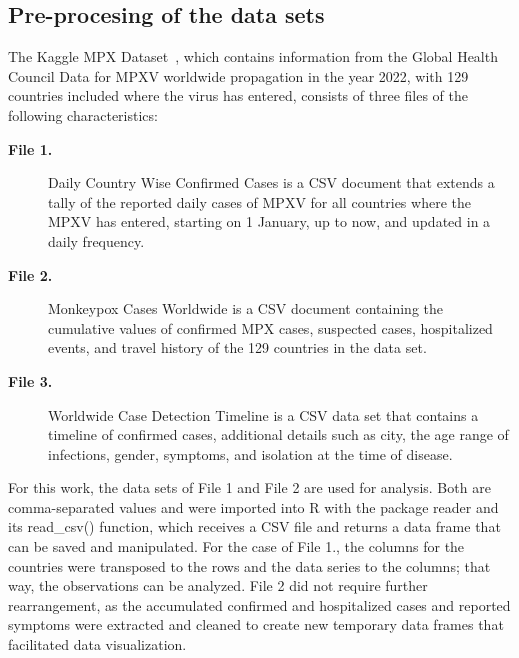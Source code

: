 \documentclass[conference]{IEEEtran}
\begin{document}
\subsection{Pre-procesing of the data sets}
The Kaggle MPX Dataset~\cite{Contractor2022}, which contains information from the Global Health Council Data for MPXV worldwide propagation in the year 2022, with 129 countries included where the virus has entered, consists of three files of the following characteristics:  

\begin{description}
    \item [\textbf{File 1.}] Daily Country Wise Confirmed Cases is a CSV document that extends a tally of the reported daily cases of MPXV for all countries where the MPXV has entered, starting on 1 January, up to now, and updated in a daily frequency. 
    \item [\textbf{File 2.}] Monkeypox Cases Worldwide is a CSV document containing the cumulative values of confirmed MPX cases, suspected cases, hospitalized events, and travel history of the 129 countries in the data set.
    \item [\textbf{File 3.}] Worldwide Case Detection Timeline is a CSV data set that contains a timeline of confirmed cases, additional details such as city, the age range of infections, gender, symptoms, and isolation at the time of disease.
\end{description}

For this work, the data sets of File 1 and File 2 are used for analysis. Both are comma-separated values and were imported into R with the package reader and its read\_csv() function, which receives a CSV file and returns a data frame that can be saved and manipulated. For the case of File 1., the columns for the countries were transposed to the rows and the data series to the columns; that way, the observations can be analyzed. File 2 did not require further rearrangement, as the accumulated confirmed and hospitalized cases and reported symptoms were extracted and cleaned to create new temporary data frames that facilitated data visualization.
\end{document}
